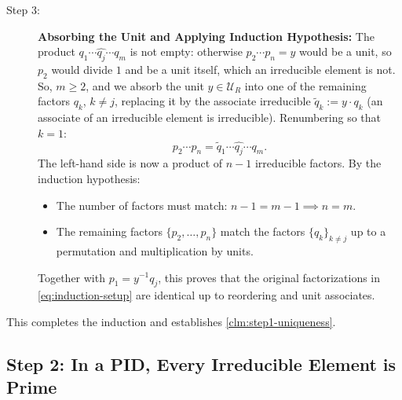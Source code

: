 \begin{proofWrapper}
\begin{content}
\begin{description}
    \item[Step 3:] \textbf{Absorbing the Unit and Applying Induction Hypothesis:} The product $q_1 \cdots \widehat{q_j} \cdots q_m$ is not empty: otherwise $p_2 \cdots p_n = y$ would be a unit, so $p_2$ would divide $1$ and be a unit itself, which an irreducible element is not. So, $m \ge 2$, and we absorb the unit $y \in \mathcal{U}_R$ into one of the remaining factors $q_k$, $k \neq j$, replacing it by the associate irreducible $\tilde{q}_k := y \cdot q_k$ (an associate of an irreducible element is irreducible). Renumbering so that $k = 1$:
    \begin{equation}\label{eq:induction-reduced-chain}
    p_2 \cdots p_n = \tilde{q}_1 \cdots \widehat{q_j} \cdots q_m.
    \end{equation}
    The left-hand side is now a product of $n - 1$ irreducible factors. By the induction hypothesis:
    \begin{itemize}
        \item The number of factors must match: $n - 1 = m - 1 \implies n = m$.
        \item The remaining factors $\{p_2, \dots, p_n\}$ match the factors $\{q_k\}_{k \neq j}$ up to a permutation and multiplication by units.
    \end{itemize}
    Together with $p_1 = y^{-1} q_j$, this proves that the original factorizations in \eqref{eq:induction-setup} are identical up to reordering and unit associates.
\end{description}
This completes the induction and establishes \cref{clm:step1-uniqueness}.
\end{content}
\end{proofWrapper}

\subsection{Step 2: In a PID, Every Irreducible Element is Prime}

